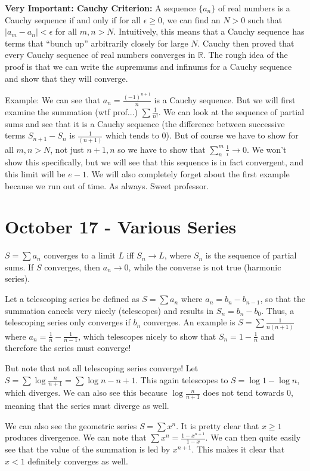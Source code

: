 \documentclass{report}
\begin{document}
\textbf{Very Important: Cauchy Criterion: } A sequence $\{a_n\}$ of real numbers is a Cauchy sequence if and only if for all $\epsilon \geq 0$, we can find an $N > 0$ such that $|a_m - a_n| < \epsilon$ for all $m,n > N$. Intuitively, this means that a Cauchy sequence has terms that ``bunch up'' arbitrarily closely for large $N$. Cauchy then proved that every Cauchy sequence of real numbers converges in $\mathbb{R}$. The rough idea of the proof is that we can write the supremums and infinums for a Cauchy sequence and show that they will converge. 

Example: We can see that $a_n = \frac{(-1)^{n+1}}{n}$ is a Cauchy sequence. But we will first examine the summation (wtf prof...) $\sum{\frac{1}{n!}}$. We can look at the sequence of partial sums and see that it is a Cauchy sequence (the difference between successive terms $S_{n+1} - S_n$ is $\frac{1}{(n+1)}$ which tends to $0$). But of course we have to show for all $m,n > N$, not just $n+1,n$ so we have to show that $\sum_n^m{\frac{1}{i}} \to 0$. We won't show this specifically, but we will see that this sequence is in fact convergent, and this limit will be $e-1$. We will also completely forget about the first example because we run out of time. As always. Sweet professor.

\chapter{October 17 - Various Series}

$S = \sum{a_n}$ converges to a limit $L$ iff $S_n \to L$, where $S_n$ is the sequence of partial sums. If $S$ converges, then $a_n \to 0$, while the converse is not true (harmonic series). 

Let a telescoping series be defined as $S = \sum{a_n}$ where $a_n = b_n - b_{n-1}$, so that the summation cancels very nicely (telescopes) and results in $S_n = b_n - b_0$. Thus, a telescoping series only converges if $b_n$ converges. An example is $S = \sum{\frac{1}{n(n+1)}}$ where $a_n = \frac{1}{n} - \frac{1}{n-1}$, which telescopes nicely to show that $S_n = 1 - \frac{1}{n}$ and therefore the series must converge!

But note that not all telescoping series converge! Let $S = \sum{\log\frac{n}{n+1}} = \sum{\log{n} - {n+1}}$. This again telescopes to $S = \log{1} - \log{n}$, which diverges. We can also see this because $\log\frac{n}{n+1}$ does not tend towards $0$, meaning that the series must diverge as well. 

We can also see the geometric series $S = \sum{x^n}$. It is pretty clear that $x \geq 1$ produces divergence. We can note that $\sum{x^n} = \frac{1-x^{n+1}}{1-x}$. We can then quite easily see that the value of the summation is led by $x^{n+1}$. This makes it clear that $x < 1$ definitely converges as well. 
\end{document}
